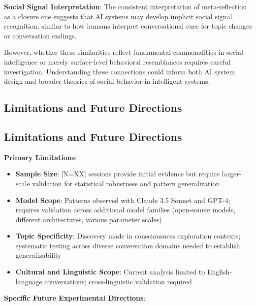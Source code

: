 \documentclass[11pt,letterpaper]{article}
\newcommand{\totalSessions}{[N=XX]} %
\begin{document}
\textbf{Social Signal Interpretation}: The consistent interpretation of meta-reflection as a closure cue suggests that AI systems may develop implicit social signal recognition, similar to how humans interpret conversational cues for topic changes or conversation endings.

However, whether these similarities reflect fundamental commonalities in social intelligence or merely surface-level behavioral resemblances requires careful investigation. Understanding these connections could inform both AI system design and broader theories of social behavior in intelligent systems.

\subsection{Limitations and Future Directions}

\subsection{Limitations and Future Directions}

\textbf{Primary Limitations}:

\begin{itemize}
    \item \textbf{Sample Size}: \totalSessions{} sessions provide initial evidence but require larger-scale validation for statistical robustness and pattern generalization
    \item \textbf{Model Scope}: Patterns observed with Claude 3.5 Sonnet and GPT-4; requires validation across additional model families (open-source models, different architectures, various parameter scales)
    \item \textbf{Topic Specificity}: Discovery made in consciousness exploration contexts; systematic testing across diverse conversation domains needed to establish generalizability
    \item \textbf{Cultural and Linguistic Scope}: Current analysis limited to English-language conversations; cross-linguistic validation required
\end{itemize}

\textbf{Specific Future Experimental Directions}:
\end{document}
